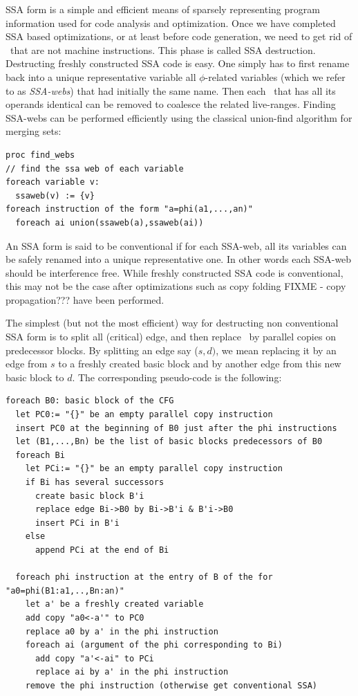 SSA form is a simple and efficient means of
sparsely representing program information used for code analysis and optimization. Once we have completed SSA based optimizations, or at least before code generation, we need to get rid of \phiops\ that are not machine instructions. This phase is called SSA destruction. 
Destructing freshly constructed SSA code is easy. One simply has to first rename back into a unique representative variable all $\phi$-related variables (which we refer to as \textit{SSA-webs}) that had initially the same name. Then each \phiop\ that has all its operands identical can be removed to coalesce the related live-ranges.
Finding SSA-webs can be performed efficiently using the classical union-find algorithm for merging sets:
\begin{verbatim}
proc find_webs
// find the ssa web of each variable
foreach variable v:
  ssaweb(v) := {v}
foreach instruction of the form "a=phi(a1,...,an)"
  foreach ai union(ssaweb(a),ssaweb(ai))
\end{verbatim}

An SSA form is said to be conventional if for each SSA-web, all its variables can be safely renamed into a unique representative one. In other words each SSA-web should be interference free. While freshly constructed SSA code is conventional, this may not be the case after optimizations such as copy folding FIXME - copy propagation???  have been performed.

The simplest (but not the most efficient) way for destructing non conventional SSA form is to split all (critical) edge, and then replace \phiops\ by parallel copies on predecessor blocks. By splitting an edge say ($s,d)$, we mean replacing it by an edge from $s$ to a freshly created basic block and by another edge from this new basic block to $d$. The corresponding pseudo-code is the following:

\begin{verbatim}
foreach B0: basic block of the CFG
  let PC0:= "{}" be an empty parallel copy instruction
  insert PC0 at the beginning of B0 just after the phi instructions
  let (B1,...,Bn) be the list of basic blocks predecessors of B0
  foreach Bi
    let PCi:= "{}" be an empty parallel copy instruction
    if Bi has several successors
      create basic block B'i
      replace edge Bi->B0 by Bi->B'i & B'i->B0
      insert PCi in B'i
    else
      append PCi at the end of Bi
    
  foreach phi instruction at the entry of B of the for "a0=phi(B1:a1,..,Bn:an)"
    let a' be a freshly created variable
    add copy "a0<-a'" to PC0
    replace a0 by a' in the phi instruction
    foreach ai (argument of the phi corresponding to Bi)
      add copy "a'<-ai" to PCi
      replace ai by a' in the phi instruction
    remove the phi instruction (otherwise get conventional SSA)
\end{verbatim}


